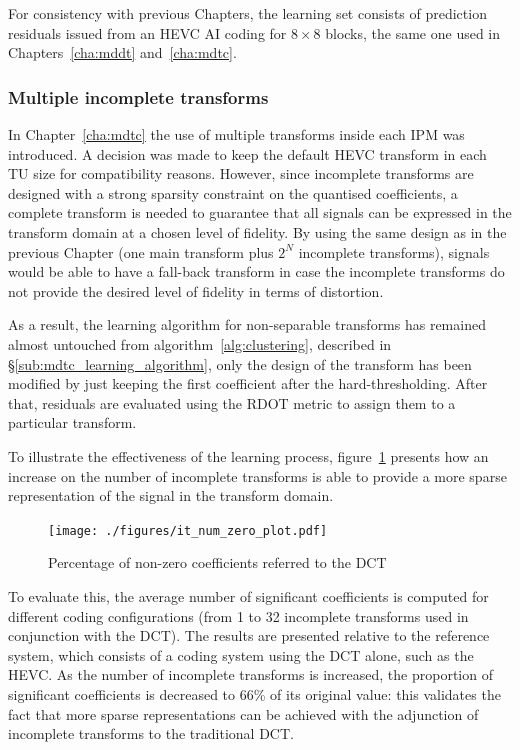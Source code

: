 \documentclass[11pt,a4paper,openright,twoside]{book}
\numberwithin{equation}{section} %
\numberwithin{figure}{section} %
\numberwithin{table}{section} %
\begin{document}
For consistency with previous Chapters, the learning set consists of
prediction residuals issued from an \ac{HEVC} \ac{AI} coding for $8\times8$
blocks, the same one used in Chapters~\ref{cha:mddt} and~\ref{cha:mdtc}.

\subsubsection{Multiple incomplete transforms}
\label{ssub:it_multiple_incomplete_transforms}

In Chapter~\ref{cha:mdtc} the use of multiple transforms inside each \ac{IPM}
was introduced.
A decision was made to keep the default \ac{HEVC} transform in each \ac{TU}
size for compatibility reasons.
However, since incomplete transforms are designed with a strong sparsity
constraint on the quantised coefficients, a complete transform is needed to
guarantee that all signals can be expressed in the transform domain at a
chosen level of fidelity.
By using the same design as in the previous Chapter (one main transform plus
$2^N$ incomplete transforms), signals would be able to have a fall-back
transform in case the incomplete transforms do not provide the desired level
of fidelity in terms of distortion.

As a result, the learning algorithm for non-separable transforms has remained
almost untouched from algorithm~\ref{alg:clustering}, described in
\S\ref{sub:mdtc_learning_algorithm}, only the design of the transform has been
modified by just keeping the first coefficient after the hard-thresholding.
After that, residuals are evaluated using the \ac{RDOT} metric to assign them
to a particular transform.

To illustrate the effectiveness of the learning process,
figure~\ref{fig:it_num_zero} presents how an increase on the number of
incomplete transforms is able to provide a more sparse representation of
the signal in the transform domain.

\begin{figure}[tp]
	\centering
	\texttt{[image: ./figures/it\_num\_zero\_plot.pdf]}
	\caption{Percentage of non-zero coefficients referred to the \acs{DCT}}
	\label{fig:it_num_zero}
\end{figure}

To evaluate this, the average number of significant coefficients is computed
for different coding configurations (from 1 to 32 incomplete transforms used
in conjunction with the \ac{DCT}).
The results are presented relative to the reference system, which consists of
a coding system using the \ac{DCT} alone, such as the \ac{HEVC}.
As the number of incomplete transforms is increased, the proportion of
significant coefficients is decreased to 66\% of its original value:
this validates the fact that more sparse representations can be achieved with
the adjunction of incomplete transforms to the traditional \ac{DCT}.
\end{document}
